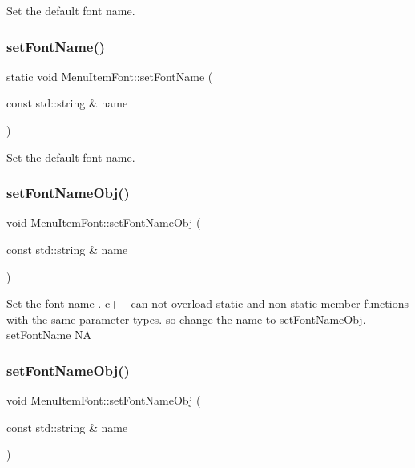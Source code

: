 Set the default font name. \mbox{\label{classMenuItemFont_a62513d80f81669bd282760ca5003e339}} 
\subsubsection{\texorpdfstring{set\+Font\+Name()}{setFontName()}\hspace{0.1cm}{\footnotesize\ttfamily [2/2]}}
{\footnotesize\ttfamily static void Menu\+Item\+Font\+::set\+Font\+Name (\begin{DoxyParamCaption}\item[{const std\+::string \&}]{name }\end{DoxyParamCaption})\hspace{0.3cm}{\ttfamily [static]}}

Set the default font name. \mbox{\label{classMenuItemFont_adc4776710917649f4dcb527d61ac49d7}} 
\subsubsection{\texorpdfstring{set\+Font\+Name\+Obj()}{setFontNameObj()}\hspace{0.1cm}{\footnotesize\ttfamily [1/2]}}
{\footnotesize\ttfamily void Menu\+Item\+Font\+::set\+Font\+Name\+Obj (\begin{DoxyParamCaption}\item[{const std\+::string \&}]{name }\end{DoxyParamCaption})}

Set the font name . c++ can not overload static and non-\/static member functions with the same parameter types. so change the name to set\+Font\+Name\+Obj.  set\+Font\+Name  NA \mbox{\label{classMenuItemFont_adc4776710917649f4dcb527d61ac49d7}} 
\subsubsection{\texorpdfstring{set\+Font\+Name\+Obj()}{setFontNameObj()}\hspace{0.1cm}{\footnotesize\ttfamily [2/2]}}
{\footnotesize\ttfamily void Menu\+Item\+Font\+::set\+Font\+Name\+Obj (\begin{DoxyParamCaption}\item[{const std\+::string \&}]{name }\end{DoxyParamCaption})}

